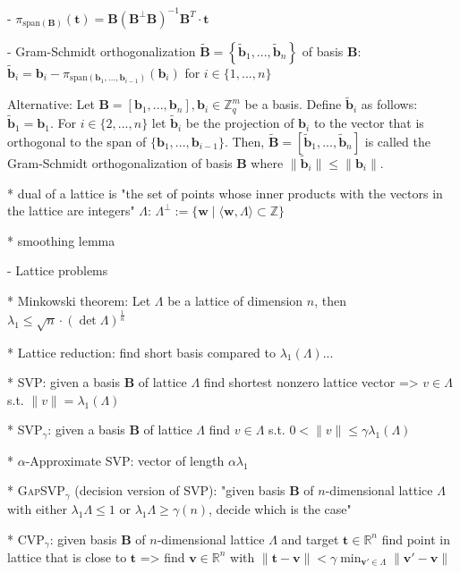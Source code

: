 \documentclass[
  a4paper,  %
  twoside,  %
  bibliography=totoc,
  headsepline,
  cleardoublepage=empty,
  parskip=half,
  draft=false
]{scrbook}
\begin{document}
    - $\pi_{\text{span}(\textbf{B})}(\textbf{t}) = \textbf{B}(\textbf{B}^\perp \textbf{B})^{-1}\textbf{B}^T \cdot \textbf{t}$

    - Gram-Schmidt orthogonalization $\tilde{\textbf{B}} = \left\{\tilde{\textbf{b}}_1, ..., \tilde{\textbf{b}}_n\right\}$ of basis $\textbf{B}$: $\tilde{\textbf{b}}_i = \textbf{b}_i - \pi_{\text{span}(\textbf{b}_1, ..., \textbf{b}_{i-1})}(\textbf{b}_i)$ for $i \in \{1, ..., n\}$ 

    Alternative:
    Let $\textbf{B} = \left[\textbf{b}_1, ..., \textbf{b}_n\right], \textbf{b}_i \in \mathbb{Z}_q^{m}$ be a basis. Define $\tilde{\textbf{b}}_i$ as follows: $\tilde{\textbf{b}}_1 = \textbf{b}_1$. For $i \in \{2, ..., n\}$ let $\tilde{\textbf{b}}_i$ be the projection of $\textbf{b}_i$ to the vector that is orthogonal to the span of $\{\textbf{b}_1, ..., \textbf{b}_{i-1}\}$. Then,  $\tilde{\textbf{B}} = \left[\tilde{\textbf{b}}_1, ..., \tilde{\textbf{b}}_n\right]$ is called the Gram-Schmidt orthogonalization of basis $\textbf{B}$ where $\| \tilde{\textbf{b}}_i\| \leq \| \textbf{b}_i\|$. 

  
  * dual of a lattice is "the set of points whose inner products with the vectors in the lattice are integers" $\Lambda$: $\Lambda^{\perp} := \{ \textbf{w} \mid \langle \textbf{w}, \Lambda \rangle \subset \mathbb{Z}\}$
    
  * smoothing lemma
    

- Lattice problems

  * Minkowski theorem: Let $\Lambda$ be a lattice of dimension $n$, then $\lambda_1 \leq \sqrt{n} \cdot (\det \Lambda)^{\frac{1}{n}}$

  * Lattice reduction: find short basis compared to $\lambda_1(\Lambda)$... 

  * SVP: given a basis $\textbf{B}$ of lattice $\Lambda$ find shortest nonzero lattice vector =>  $v\in \Lambda$ s.t. $\| v \| = \lambda_1(\Lambda)$

  * SVP$_\gamma$: given a basis $\textbf{B}$ of lattice $\Lambda$ find  $v\in \Lambda$ s.t. $0 < \| v \| \leq \gamma \lambda_1(\Lambda)$

  * $\alpha$-Approximate SVP: vector of length $\alpha \lambda_1$

  * \textsc{GapSVP}$_\gamma$ (decision version of \textsc{SVP}): "given basis $\textbf{B}$ of $n$-dimensional lattice $\Lambda$ with either $\lambda_1{\Lambda} \leq 1$ or $\lambda_1{\Lambda} \geq \gamma(n)$, decide which is the case" %

  * CVP$_\gamma$: given  basis $\textbf{B}$ of $n$-dimensional lattice $\Lambda$ and target $\textbf{t}\in\mathbb{R}^n$ find point in lattice that is close to $\textbf{t}$ => find  $\textbf{v} \in \mathbb{R}^n$ with $\|\textbf{t} - \textbf{v}\| < \gamma \min_{\textbf{v}' \in \Lambda} \|\textbf{v}' - \textbf{v}\|$
\end{document}
